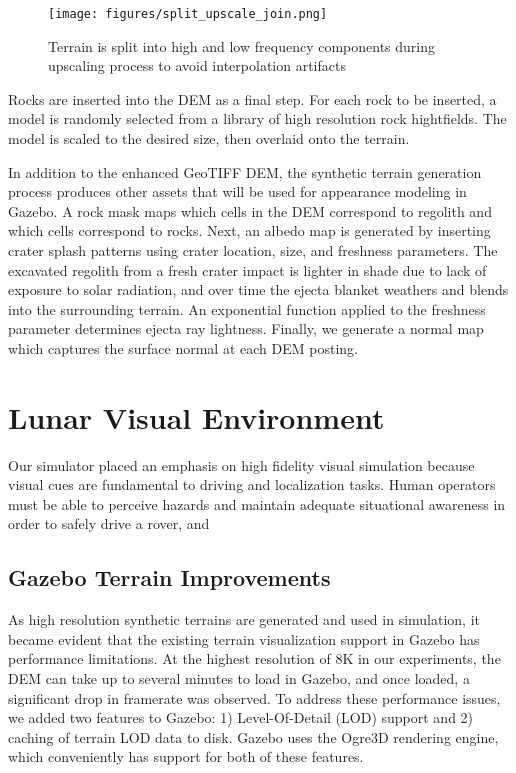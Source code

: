 \documentclass[twocolumn,letterpaper]{IEEEAerospaceCLS}  %
\begin{document}
\begin{figure}[h!]
  \texttt{[image: figures/split\_upscale\_join.png]}
    \caption{Terrain is split into high and low frequency components during upscaling process to avoid interpolation artifacts}
    \label{fig:split_upscale_join}
\end{figure}

Rocks are inserted into the DEM as a final step. For each rock to be inserted, a model is randomly selected from a library of high resolution rock hightfields. The model is scaled to the desired size, then overlaid onto the terrain.

In addition to the enhanced GeoTIFF DEM, the synthetic terrain generation process produces other assets that will be used for appearance modeling in Gazebo. 
A rock mask maps which cells in the DEM correspond to regolith and which cells correspond to rocks. 
Next, an albedo map is generated by inserting crater splash patterns using crater location, size, and freshness parameters. 
The excavated regolith from a fresh crater impact is lighter in shade due to lack of exposure to solar radiation, and over time the ejecta blanket weathers and blends into the surrounding terrain. 
An exponential function applied to the freshness parameter determines ejecta ray lightness. 
Finally, we generate a normal map which captures the surface normal at each DEM posting. 


\section{Lunar Visual Environment}
Our simulator placed an emphasis on high fidelity visual simulation because visual cues are fundamental to driving and localization tasks. Human operators must be able to perceive hazards and maintain adequate situational awareness in order to safely drive a rover, and 


\subsection{Gazebo Terrain Improvements}

As high resolution synthetic terrains are generated and used in simulation, it became evident that the existing terrain visualization support in Gazebo has performance limitations. 
At the highest resolution of 8K in our experiments, the DEM can take up to several minutes to load in Gazebo, and once loaded, a significant drop in framerate was observed. 
To address these performance issues, we added two features to Gazebo: 1) Level-Of-Detail (LOD) support and 2) caching of terrain LOD data to disk.
Gazebo uses the Ogre3D rendering engine, which conveniently has support for both of these features. 
\end{document}
